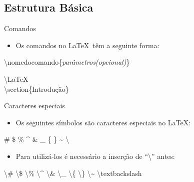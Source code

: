 \documentclass{beamer}
\begin{document}
\subsection{Estrutura Básica}

\begin{frame}{Comandos}
	\begin{itemize}
	\item Os comandos no \LaTeX\ têm a seguinte forma:
	\end{itemize}

	\alert{\textbackslash nomedocomando\{\textit{parâmetros(opcional)}\} }
	
	\vspace{.5cm}

	\begin{example}
		\textbackslash LaTeX \\
		\textbackslash section\{Introdução\}		
	\end{example}
\end{frame}

\begin{frame}{Caracteres especiais}
	\begin{itemize}
	\item Os seguintes símbolos são caracteres especiais no \LaTeX:
	\end{itemize}

	\alert{\# \$ \% \^{} \& \_ \{ \} \~{} \textbackslash}

	\begin{itemize}
	\item Para utilizá-los é necessário a inserção de ``\textbackslash'' antes:
	\end{itemize}

	\alert{
	   \textbackslash\# 
	   \textbackslash\$ 
	   \textbackslash\% 
	   \textbackslash\^{} 
	   \textbackslash\& 
	   \textbackslash\_ 
	   \textbackslash\{ 
	   \textbackslash\} 
	   \textbackslash\~{} 
	   \textbackslash textbackslash
	}
\end{frame}
\end{document}
